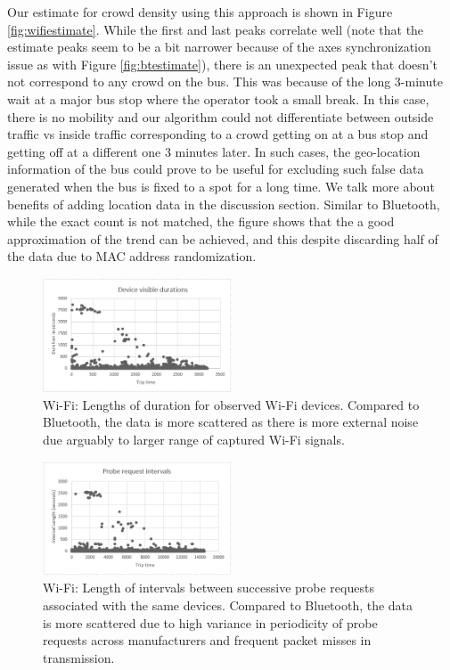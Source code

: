 Our estimate for crowd density using this approach is shown in Figure \ref{fig:wifiestimate}. While the first and last peaks correlate well (note that the estimate peaks seem to be a bit narrower because of the axes synchronization issue as with Figure \ref{fig:btestimate}), there is an unexpected peak that doesn't not correspond to any crowd on the bus. This was because of the long 3-minute wait at a major bus stop where the operator took a small break. In this case, there is no mobility and our algorithm could not differentiate between outside traffic vs inside traffic corresponding to a crowd getting on at a bus stop and getting off at a different one 3 minutes later. In such cases, the geo-location information of the bus could prove to be useful for excluding such false data generated when the bus is fixed to a spot for a long time. We talk more about benefits of adding location data in the discussion section. Similar to Bluetooth, while the exact count is not matched, the figure shows that the a good approximation of the trend can be achieved, and this despite discarding half of the data due to MAC address randomization.

\begin{figure}[!t]
\centering
\includegraphics[width=0.5\textwidth]{wifi_device_durations.png}
\caption{Wi-Fi: Lengths of duration for observed Wi-Fi devices. Compared to Bluetooth, the data is more scattered as there is more external noise due arguably to larger range of captured Wi-Fi signals.}
\label{fig:wifidurations}
\end{figure}

\begin{figure}[!t]
\centering
\includegraphics[width=0.5\textwidth]{wifi_interval_length.png}
\caption{Wi-Fi: Length of intervals between successive probe requests associated with the same devices. Compared to Bluetooth, the data is more scattered due to high variance in periodicity of probe requests across manufacturers and frequent packet misses in transmission.}
\label{fig:wifiintervals}
\end{figure}

